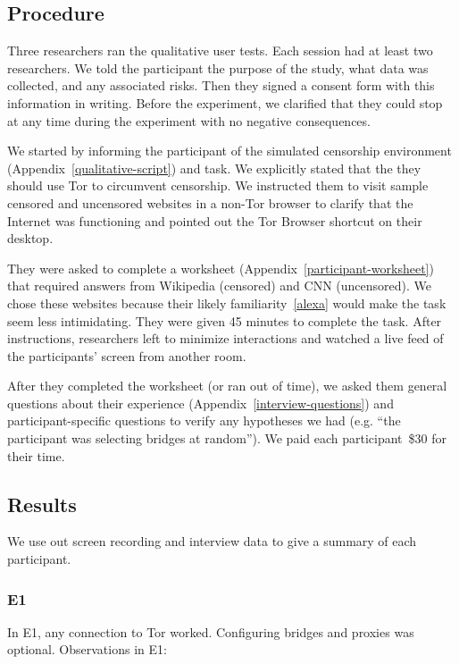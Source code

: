 \documentclass[USenglish,oneside,twocolumn]{article}
\begin{document}
\subsection{Procedure}
Three researchers ran the qualitative user tests. Each session had at least two researchers.  
We told the participant the purpose of the 
study, what data was collected, and any associated risks. 
Then they signed a consent form with this information in writing. 
Before the experiment, we clarified that they could stop at any time during the experiment with no negative consequences. 

We started by informing the participant of the simulated censorship environment (Appendix~\ref{qualitative-script}) and task. We explicitly stated that the they should use Tor to circumvent censorship. 
We instructed them to visit sample censored and uncensored websites
in a non-Tor browser to clarify that the Internet was functioning and
pointed out the Tor Browser shortcut on their desktop.

They were asked to complete a worksheet (Appendix~\ref{participant-worksheet}) that 
required answers from Wikipedia (censored) and CNN (uncensored).
We chose these websites because their likely familiarity~\ref{alexa}
would make the task seem less intimidating. They were given 45 minutes to complete the task. 
After instructions, researchers left to minimize interactions and watched a live feed of the participants' screen from another room.

After they completed the worksheet (or ran out of time),
we asked them general questions about their experience (Appendix~\ref{interview-questions}) and participant-specific questions to verify any hypotheses we had (e.g. ``the participant was selecting bridges at random''). We paid each participant~\$30 for their time. 

\subsection{Results} 
We use out screen recording and interview data to give a summary of each participant.



\subsubsection{E1} 
In E1, any connection to Tor worked. Configuring bridges and proxies was optional.  
Observations in E1: 
\end{document}
